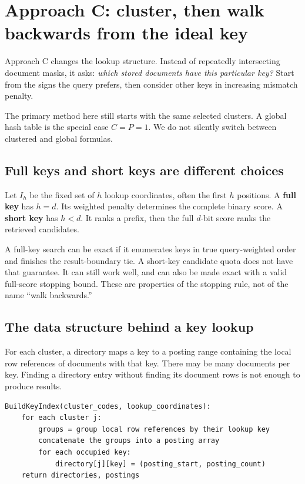 \section{Approach C: cluster, then walk backwards from the ideal key}
\label{sec:keys}
Approach C changes the lookup structure. Instead of repeatedly intersecting document masks,
it asks: \emph{which stored documents have this particular key?} Start from the signs the query
prefers, then consider other keys in increasing mismatch penalty.

The primary method here still starts with the same selected clusters. A global hash table is
the special case $C=P=1$. We do not silently switch between clustered and global formulas.


\subsection{Full keys and short keys are different choices}
Let $I_h$ be the fixed set of $h$ lookup coordinates, often the first $h$ positions. A
\textbf{full key} has $h=d$. Its weighted penalty determines the complete binary score.
A \textbf{short key} has $h<d$. It ranks a prefix, then the full $d$-bit score ranks the
retrieved candidates.

A full-key search can be exact if it enumerates keys in true query-weighted order and finishes
the result-boundary tie. A short-key candidate quota does not have that guarantee. It can still
work well, and can also be made exact with a valid full-score stopping bound. These are
properties of the stopping rule, not of the name ``walk backwards.''

\subsection{The data structure behind a key lookup}
For each cluster, a directory maps a key to a posting range containing the local row references
of documents with that key. There may be many documents per key. Finding a directory entry
without finding its document rows is not enough to produce results.

\par\noindent\begin{minipage}{\linewidth}
\begin{lstlisting}[caption={Build a clustered key index.}]
BuildKeyIndex(cluster_codes, lookup_coordinates):
    for each cluster j:
        groups = group local row references by their lookup key
        concatenate the groups into a posting array
        for each occupied key:
            directory[j][key] = (posting_start, posting_count)
    return directories, postings
\end{lstlisting}
\end{minipage}\par

